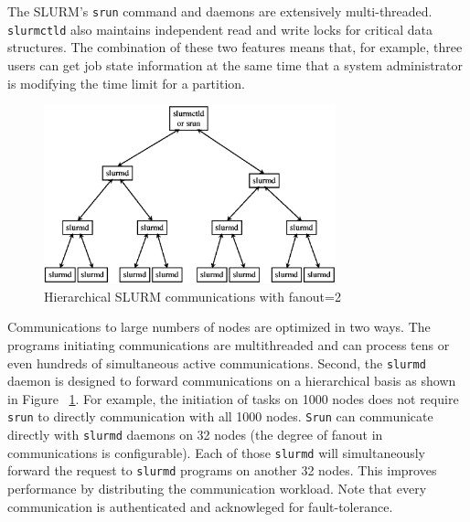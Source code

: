 \documentclass[10pt,twocolumn,times]{../common/llncs}
\begin{document}
{The SLURM's {\tt srun} command and  daemons are extensively 
multi-threaded. 
{\tt slurmctld} also maintains independent read and 
write locks for critical data structures. 
The combination of these two features means that, 
for example, three users can get job state information at the same
time that a system administrator is modifying the time limit 
for a partition.

\begin{figure}[tcb]
\centerline{\includegraphics[width=3.32in]{../figures/comm.eps}}
\caption{\small Hierarchical SLURM communications with fanout=2}
\label{comms}
\end{figure}

Communications to large numbers of nodes are optimized in two 
ways. The programs initiating communications are multithreaded
and can process tens or even hundreds of simultaneous active 
communications. 
Second, the {\tt slurmd} daemon is designed to forward 
communications on a hierarchical basis as shown in Figure ~\ref{comms}.
For example, the initiation of tasks on 1000 nodes does not require
{\tt srun} to directly communication with all 1000 nodes. {\tt Srun}
can communicate directly with {\tt slurmd} daemons on 32 nodes
(the degree of fanout in communications is configurable). 
Each of those {\tt slurmd} will simultaneously forward the request
to {\tt slurmd} programs on another 32 nodes. 
This improves performance by distributing the communication workload.
Note that every communication is authenticated and acknowleged 
for fault-tolerance.

}
\end{document}
